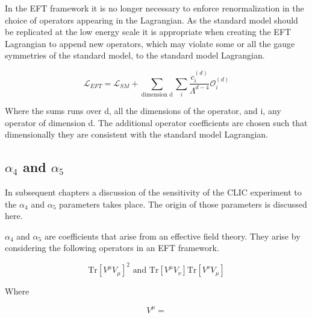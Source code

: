 In the EFT framework it is no longer necessary to enforce renormalization in the choice of operators appearing in the Lagrangian.  As the standard model should be replicated at the low energy scale it is appropriate when creating the EFT Lagrangian to append new operators, which may violate some or all the gauge symmetries of the standard model, to the standard model Lagrangian.

\begin{equation}
\mathcal{L}_{EFT} = \mathcal{L}_{SM} + \sum_{\text{dimension d}} \sum_{i} \frac{c_{i}^{(d)}}{\Lambda^{d-4}} \mathcal{O}_{i}^{(d)}
\end{equation}

Where the sums runs over d, all the dimensions of the operator, and i, any operator of dimension d.  The additional operator coefficients are chosen such that dimensionally they are consistent with the standard model Lagrangian.  

\subsection{$\alpha_{4}$ and $\alpha_{5}$}

In subsequent chapters a discussion of the sensitivity of the CLIC experiment to the $\alpha_{4}$ and $\alpha_{5}$ parameters takes place.  The origin of those parameters is discussed here.

$\alpha_{4}$ and $\alpha_{5}$ are coefficients that arise from an effective field theory.  They arise by considering the following operators in an EFT framework.

\begin{equation}
\text{Tr}[V^{\mu}V_{\mu}]^{2} \text{ and } \text{Tr}[V^{\mu}V_{\nu}]\text{Tr}[V^{\nu}V_{\mu}]
\end{equation}

Where 

\begin{equation}
V^{\mu} = 
 \end{equation}
